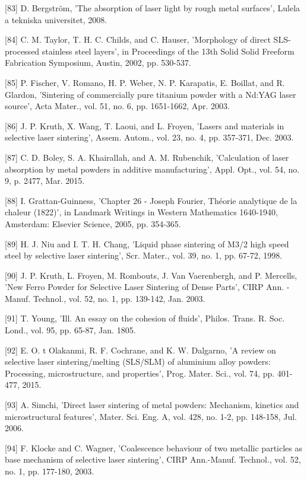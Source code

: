 \documentclass[10pt]{article}
\begin{document}
[83] D. Bergström, 'The absorption of laser light by rough metal surfaces', Lulela a tekniska universitet, 2008.

[84] C. M. Taylor, T. H. C. Childs, and C. Hauser, 'Morphology of direct SLS-processed stainless steel layers', in Proceedings of the 13th Solid Solid Freeform Fabrication Symposium, Austin, 2002, pp. 530-537.

[85] P. Fischer, V. Romano, H. P. Weber, N. P. Karapatis, E. Boillat, and R. Glardon, 'Sintering of commercially pure titanium powder with a Nd:YAG laser source', Acta Mater., vol. 51, no. 6, pp. 1651-1662, Apr. 2003.

[86] J. P. Kruth, X. Wang, T. Laoui, and L. Froyen, 'Lasers and materials in selective laser sintering', Assem. Autom., vol. 23, no. 4, pp. 357-371, Dec. 2003.

[87] C. D. Boley, S. A. Khairallah, and A. M. Rubenchik, 'Calculation of laser absorption by metal powders in additive manufacturing', Appl. Opt., vol. 54, no. 9, p. 2477, Mar. 2015.

[88] I. Grattan-Guinness, 'Chapter 26 - Joseph Fourier, Théorie analytique de la chaleur (1822)', in Landmark Writings in Western Mathematics 1640-1940, Amsterdam: Elsevier Science, 2005, pp. 354-365.

[89] H. J. Niu and I. T. H. Chang, 'Liquid phase sintering of M3/2 high speed steel by selective laser sintering', Scr. Mater., vol. 39, no. 1, pp. 67-72, 1998.

[90] J. P. Kruth, L. Froyen, M. Rombouts, J. Van Vaerenbergh, and P. Mercells, 'New Ferro Powder for Selective Laser Sintering of Dense Parts', CIRP Ann. - Manuf. Technol., vol. 52, no. 1, pp. 139-142, Jan. 2003.

[91] T. Young, 'Ill. An essay on the cohesion of fluids', Philos. Trans. R. Soc. Lond., vol. 95, pp. 65-87, Jan. 1805.

[92] E. O. t Olakanmi, R. F. Cochrane, and K. W. Dalgarno, 'A review on selective laser sintering/melting (SLS/SLM) of aluminium alloy powders: Processing, microstructure, and properties', Prog. Mater. Sci., vol. 74, pp. 401-477, 2015.

[93] A. Simchi, 'Direct laser sintering of metal powders: Mechanism, kinetics and microstructural features', Mater. Sci. Eng. A, vol. 428, no. 1-2, pp. 148-158, Jul. 2006.

[94] F. Klocke and C. Wagner, 'Coalescence behaviour of two metallic particles as base mechanism of selective laser sintering', CIRP Ann.-Manuf. Technol., vol. 52, no. 1, pp. 177-180, 2003.
\end{document}
